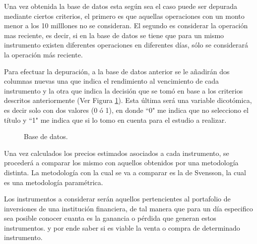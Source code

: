 \hspace{0.4cm} Una vez obtenida la base de datos esta seg\'un sea el caso puede ser depurada mediante ciertos criterios, el primero es que aquellas operaciones con un monto menor a los 10 milllones no se consideran. El segundo es considerar la operaci\'on mas reciente, es decir, si en la base de datos se tiene que para un mismo instrumento existen diferentes operaciones en diferentes d\'ias, s\'olo se considerar\'a la operaci\'on m\'as reciente.


\hspace{0.4cm} Para efectuar la depuraci\'on, a la base de datos anterior se le a\~nadir\'an dos columnas nuevas una que indica el rendimiento al vencimiento de cada instrumento y la otra que indica la decisi\'on que se tom\'o en base a los criterios descritos anteriormente (Ver Figura \ref{base_datos}). Esta \'ultima ser\'a una variable dicot\'omica, es decir solo con dos valores (0 \'o 1), en donde ``0" me indica que no selecciono el t\'itulo y ``1" me indica que si lo tomo en cuenta para el estudio a realizar.

\begin{figure}[h]
\caption{Base de datos.}
\label{base_datos}
\end{figure}


\hspace{0.4cm} Una vez calculados los precios estimados asociados a cada instrumento, se proceder\'a a comparar los mismo con aquellos obtenidos por una metodolog\'ia distinta. La metodolog\'ia con la cual se va a comparar es la de Svensson, la cual es una metodolog\'ia param\'etrica.



\hspace{0.4cm} Los instrumentos a considerar ser\'an aquellos pertencientes al portafolio de inversiones de una instituci\'on financiera, de tal manera que para un d\'ia especifico sea posible conocer cuanta es la ganancia o p\'erdida que generan estos instrumentos. y por ende saber si es viable la venta o compra de determinado instrumento.


